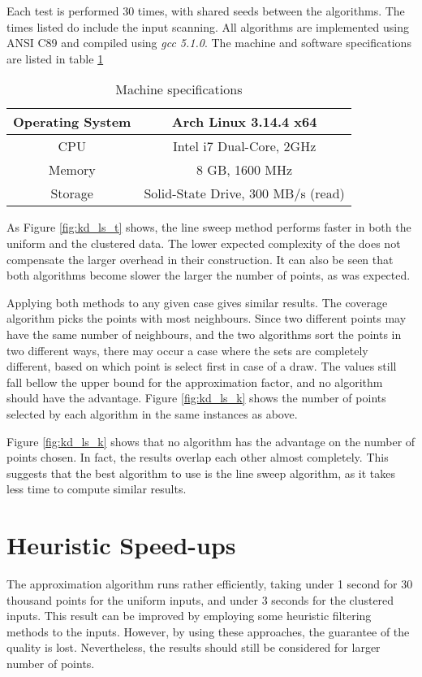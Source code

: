Each test is performed 30 times, with shared seeds between the algorithms. The times listed do include the input scanning. All algorithms are implemented using ANSI C89 and compiled using \emph{gcc 5.1.0}. The machine and software specifications are listed in table \ref{tab:specs2}

\begin{table}[H]
	\begin{center}
		\begin{tabular}{|c|c|}
			\hline
			Operating System  & Arch Linux 3.14.4 x64\\\hline
			CPU & Intel i7 Dual-Core, 2GHz\\\hline
			Memory & 8 GB, 1600 MHz \\\hline
			Storage &  Solid-State Drive, 300 MB/s (read)\\\hline
		\end{tabular}
		\caption{Machine specifications}
		\label{tab:specs2}
	\end{center}
\end{table}



As Figure \ref{fig:kd_ls_t} shows, the line sweep method performs faster in both the uniform and the clustered data. The lower expected complexity of the \kdtrees does not compensate the larger overhead in their construction. It can also be seen that both algorithms become slower the larger the number of points, as was expected.

Applying both methods to any given case gives similar results. The coverage algorithm picks the points with most neighbours. Since two different points may have the same number of neighbours, and the two algorithms sort the points in two different ways, there may occur a case where the sets are completely different, based on which point is select first in case of a draw. The values still fall bellow the upper bound for the approximation factor, and no algorithm should have the advantage. Figure \ref{fig:kd_ls_k} shows the number of points selected by each algorithm in the same instances as above.



Figure \ref{fig:kd_ls_k} shows that no algorithm has the advantage on the number of points chosen. In fact, the results overlap each other almost completely. This suggests that the best algorithm to use is the line sweep algorithm, as it takes less time to compute similar results.

\section{Heuristic Speed-ups}
The approximation algorithm runs rather efficiently, taking under 1 second for 30 thousand points for the uniform inputs, and under 3 seconds for the clustered inputs. This result can be improved by employing some heuristic filtering methods to the inputs. However, by using these approaches, the guarantee of the quality is lost. Nevertheless, the results should still be considered for larger number of points.
